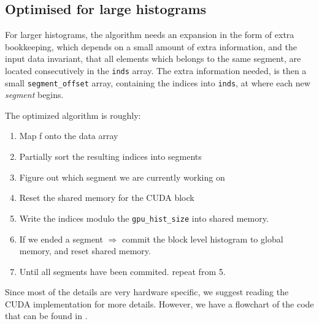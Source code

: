 \documentclass[12pt, a4paper, hidelinks]{article}
\renewcommand{\tt}[1]{\texttt{#1}}
\renewcommand{\it}[1]{\textit{#1}}
\begin{document}
\subsection{Optimised for large histograms}
For larger histograms, the algorithm needs an expansion in the form
of extra bookkeeping, which depends on a small amount of extra information, and
the input data invariant, that all elements which belongs to the same segment,
are located consecutively in the \tt{inds} array.
The extra information needed, is then a small \tt{segment\_offset} array,
containing the indices into \tt{inds}, at where each new \it{segment} begins.

The optimized algorithm is roughly:


\begin{enumerate}
\item Map f onto the data array
\item Partially sort the resulting indices into segments
\item Figure out which segment we are currently working on
\item Reset the shared memory for the CUDA block
\item Write the indices modulo the \tt{gpu\_hist\_size} into shared memory.
\item If we ended a segment $\Rightarrow$ commit the block level histogram to global memory,
      and reset shared memory.
\item Until all segments have been commited. repeat from 5.
\end{enumerate}

Since most of the details are very hardware specific,
we suggest reading the CUDA implementation for more details.
However, we have a flowchart of the code that can be found in .
\end{document}

